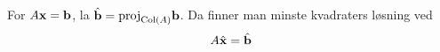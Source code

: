For $A\mathbf{x}=\mathbf{b}$, la $\hat{\mathbf{b}} = \text{proj}_{\text{Col}(A)}\mathbf{b}$.
Da finner man minste kvadraters løsning ved
$$A\hat{\mathbf{x}}=\hat{\mathbf{b}}$$
